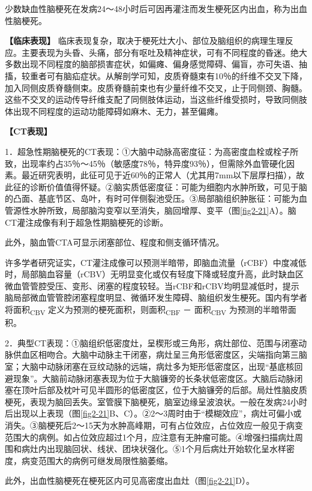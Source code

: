少数缺血性脑梗死在发病24～48小时后可因再灌注而发生梗死区内出血，称为出血性脑梗死。

\textbf{【临床表现】}
临床表现复杂，取决于梗死灶大小、部位及脑组织的病理生理反应。主要表现为头昏、头痛，部分有呕吐及精神症状，可有不同程度的昏迷。绝大多数出现不同程度的脑部损害症状，如偏瘫、偏身感觉障碍、偏盲，亦可失语、抽搐，较重者可有脑疝症状。从解剖学可知，皮质脊髓束有10％的纤维不交叉下降，加入同侧皮质脊髓侧束。皮质脊髓前束也有少量纤维不交叉，止于同侧颈、胸髓。这些不交叉的运动传导纤维支配了同侧肢体运动，当这些纤维受损时，导致同侧肢体出现不同程度的运动功能障碍如麻木、无力，甚至偏瘫。

\textbf{【CT表现】}

1．超急性期脑梗死的CT表现：①大脑中动脉高密度征：为高密度血栓或栓子所致，出现率约占35％～45％（敏感度78％，特异度93％），但需除外血管硬化因素。最近研究表明，此征可见于近60％的正常人（尤其用7mm以下层厚扫描），故此征的诊断价值值得怀疑。②脑实质低密度征：可能为细胞内水肿所致，可见于脑的凸面、基底节区、岛叶，有时可伴侧裂池受压。③局部脑组织肿胀征：可能为血管源性水肿所致，局部脑沟变窄以至消失，脑回增厚、变平（图\ref{fig2-21}A）。脑CT灌注成像有利于超急性期脑梗死的诊断。

此外，脑血管CTA可显示闭塞部位、程度和侧支循环情况。

许多学者研究证实，CT灌注成像可以预测半暗带，即脑血流量（rCBF）中度减低时，局部脑血容量（rCBV）无明显变化或仅有轻度下降或轻度升高，此时缺血区微血管管腔受压、变形、闭塞的程度较轻。当rCBF和rCBV均明显减低时，提示脑局部微血管管腔闭塞程度明显、微循环发生障碍、脑组织发生梗死。国内有学者将面积\textsubscript{CBV}
定义为预测的梗死面积，则面积\textsubscript{CBF} －
面积\textsubscript{CBV} 为预测的半暗带面积。

2．典型CT表现：①脑组织低密度灶，呈楔形或三角形，病灶部位、范围与闭塞动脉供血区相吻合。大脑中动脉主干闭塞，病灶呈三角形低密度区，尖端指向第三脑室；大脑中动脉闭塞在豆纹动脉的远端，病灶多为矩形低密度区，出现“基底核回避现象”。大脑前动脉闭塞表现为位于大脑镰旁的长条状低密度区。大脑后动脉闭塞在顶叶后部及枕叶可见半圆形的低密度区，位于大脑镰旁的后部。局灶性脑皮质梗死，表现为脑回丢失。室管膜下脑梗死，脑室边缘呈波浪状。一般在发病24小时后出现以上表现（图\ref{fig2-21}B、C）。②2～3周时由于“模糊效应”，病灶可偏小或消失。③脑梗死后2～15天为水肿高峰期，可有占位效应，占位效应一般见于病变范围大的病例。如占位效应超过1个月，应注意有无肿瘤可能。④增强扫描病灶周围和病灶内出现脑回状、线状、团块状强化。⑤1个月后病灶开始软化呈水样密度，病变范围大的病例可继发局限性脑萎缩。

此外，出血性脑梗死在梗死区内可见高密度出血灶（图\ref{fig2-21}D）。



